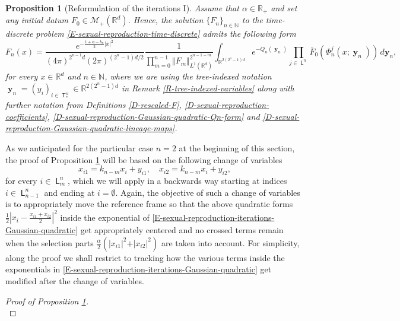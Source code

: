 \documentclass[reqno]{amsart}
\newtheorem{proposition}[definition]{Proposition}
\DeclareMathOperator{\Tree}{\mathsf{T}}
\DeclareMathOperator{\Leaves}{\mathsf{L}}
\DeclareMathOperator{\Level}{\mathsf{L}}
\DeclareMathOperator{\by}{\mathbf{y}}
\numberwithin{equation}{section}
\begin{document}
{\begin{proposition}[Reformulation of the iterations I]\label{P-sexual-reproduction-iterations-Gaussian-quadratic-change-variables}
Assume that $\alpha\in \mathbb{R}_+$ and set any initial datum $F_0\in \mathcal{M}_+(\mathbb{R}^d)$. Hence, the solution $\{F_n\}_{n\in \mathbb{N}}$ to the time-discrete problem \eqref{E-sexual-reproduction-time-discrete} admits the following form
\begin{equation}\label{E-sexual-reproduction-iterations-Gaussian-quadratic-change-variables}
F_n(x)=\frac{e^{-\frac{1+\alpha-k_n}{2}\vert x\vert^2}}{(4\pi)^{2^{n-1}d}(2\pi)^{(2^n-1)d/2}}\frac{1}{\prod_{m=0}^{n-1}\Vert F_m\Vert_{L^1(\mathbb{R}^d)}^{2^{n-1-m}}}\int_{\mathbb{R}^{2(2^n-1)d}}e^{-Q_n(\by_n)}\prod_{j\in \Leaves^n}\bar{F}_0(\Phi_n^j(x;\by_n))\,d\mathbf{y}_n,
\end{equation}
for every $x\in \mathbb{R}^d$ and $n\in \mathbb{N}$, where we are using the tree-indexed notation $\by_n=(y_i)_{i\in \Tree^n_*}\in \mathbb{R}^{2(2^n-1)d}$ in Remark \ref{R-tree-indexed-variables} along with further notation from Definitions \ref{D-rescaled-F}, \ref{D-sexual-reproduction-coefficients}, \ref{D-sexual-reproduction-Gaussian-quadratic-Qn-form} and \ref{D-sexual-reproduction-Gaussian-quadratic-lineage-maps}.
\end{proposition}

As we anticipated for the particular case $n=2$ at the beginning of this section, the proof of Proposition \ref{P-sexual-reproduction-iterations-Gaussian-quadratic-change-variables} will be based on the following change of variables
$$
x_{i1}=k_{n-m}x_i+y_{i1},\quad x_{i2}=k_{n-m}x_i+y_{i2},
$$
for every $i\in \Level_m^n$, which we will apply in a backwards way starting at indices $i\in \Level_{n-1}^n$ and ending at $i=\emptyset$. Again, the objective of such a change of variables is to appropriately move the reference frame so that the above quadratic forms $\frac{1}{2}\left\vert x_i-\frac{x_{i1}+x_{i2}}{2}\right\vert^2$ inside the exponential of \eqref{E-sexual-reproduction-iterations-Gaussian-quadratic} get appropriately centered and no crossed terms remain when the selection parts $\frac{\alpha}{2}(\vert x_{i1}\vert^2+\vert x_{i2}\vert^2)$ are taken into account. For simplicity, along the proof we shall restrict to tracking how the various terms inside the exponentials in \eqref{E-sexual-reproduction-iterations-Gaussian-quadratic} get modified after the change of variables.

\begin{proof}[Proof of Proposition \ref{P-sexual-reproduction-iterations-Gaussian-quadratic-change-variables}]~\\


\end{proof}}
\end{document}
